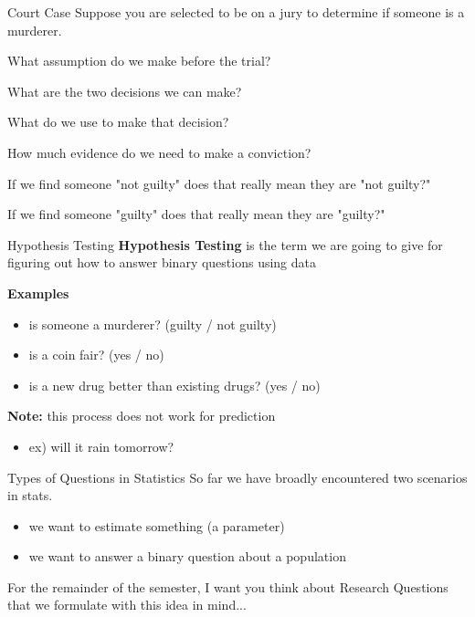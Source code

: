 \documentclass{beamer}
\begin{document}
\begin{frame}{Court Case}
Suppose you are selected to be on a jury to determine if someone is a murderer.

\hrulefill

What assumption do we make before the trial? \vspace{5mm}

What are the two decisions we can make? \vspace{5mm}

What do we use to make that decision? \vspace{5mm}

How much evidence do we need to make a conviction? \vspace{5mm}

If we find someone "not guilty" does that really mean they are "not guilty?" \vspace{5mm}

If we find someone "guilty" does that really mean they are "guilty?"
\vspace{5mm}
\end{frame} 

\begin{frame}{Hypothesis Testing}
\textbf{Hypothesis Testing} is the term we are going to give for figuring out how to answer binary questions using data \vspace{8mm}

\textbf{Examples}
\begin{itemize}
    \item is someone a murderer? (guilty / not guilty)
    \item is a coin fair? (yes / no)
    \item is a new drug better than existing drugs? (yes / no)
\end{itemize} \vspace{6mm}

\textbf{Note:} this process does not work for prediction
\begin{itemize}
    \item ex) will it rain tomorrow?
\end{itemize}
\end{frame}

\begin{frame}{Types of Questions in Statistics}
So far we have broadly encountered two scenarios in stats.
\begin{itemize}
    \item we want to estimate something (a parameter)
    \item we want to answer a binary question about a population
\end{itemize} \vspace{10mm}

For the remainder of the semester, I want you think about Research Questions that we formulate with this idea in mind...
\end{frame}
\end{document}

